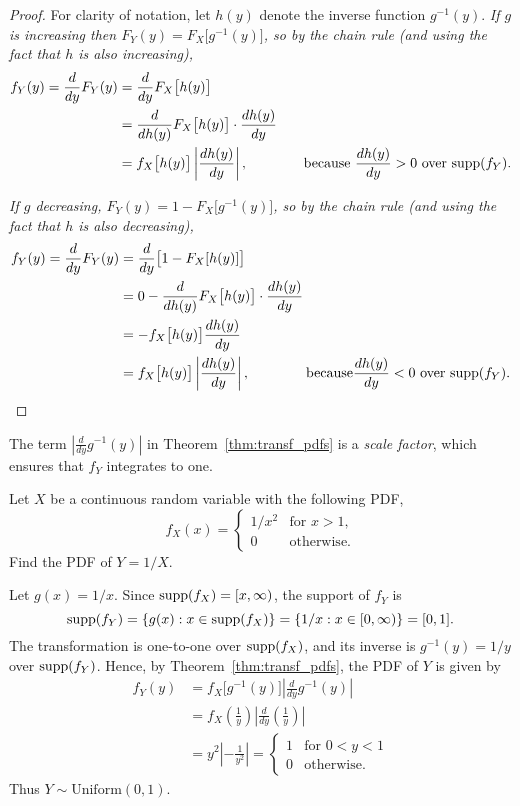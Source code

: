 \begin{proof}
For clarity of notation, let $h(y)$ denote the inverse function $g^{-1}(y)$.
\ben
\it If $g$ is increasing then $F_Y(y) = F_X\big[g^{-1}(y)\big]$, so by the chain rule (and using the fact that $h$ is also increasing),
\begin{align*}
f_Y(y)
	= \frac{d}{dy} F_Y(y)
	& = \frac{d}{dy} F_X\big[h(y)\big] \\
	& = \frac{d}{dh(y)} F_X\big[h(y)\big]\cdot \frac{dh(y)}{dy} \\
	& = f_X\big[h(y)\big]\left|\frac{dh(y)}{dy}\right|, \text{\qquad\qquad because } \frac{dh(y)}{dy}>0\text{ over $\text{supp}(f_Y)$.}
\end{align*}

\it If $g$ decreasing, $F_Y(y) = 1 - F_X\big[g^{-1}(y)\big]$, so by the chain rule  (and using the fact that $h$ is also decreasing),
\begin{align*}
f_Y(y)
	= \frac{d}{dy} F_Y(y)
	& = \frac{d}{dy} \big[1 - F_X[h(y)]\big] \\
	& = 0 - \frac{d}{dh(y)} F_X\big[h(y)\big]\cdot \frac{dh(y)}{dy} \\
	& = - f_X\big[h(y)\big] \frac{dh(y)}{dy} \\
	& = f_X\big[h(y)\big]\left|\frac{dh(y)}{dy}\right|, \text{\qquad\qquad because} \frac{dh(y)}{dy}<0\text{ over $\text{supp}(f_Y)$.}
\end{align*}
\een
\end{proof}

\begin{remark}
The term $\left|\frac{d}{dy}g^{-1}(y)\right|$ in Theorem~\ref{thm:transf_pdfs} is a \emph{scale factor}, which ensures that $f_Y$ integrates to one.
\end{remark}

\begin{example}
Let $X$ be a continuous random variable with the following PDF,
\[
f_X(x) = \begin{cases}
	1/x^2	& \text{for $x > 1$,} \\
	0		& \text{otherwise.}
\end{cases}
\]
Find the PDF of $Y=1/X$.
\end{example}

\begin{solution}
Let $g(x) = 1/x$. Since $\text{supp}(f_X)=[x,\infty)$, the support of $f_Y$ is 
\[
\text{supp}(f_Y) = \{g(x): x\in\text{supp}(f_X)\} = \{1/x :x\in[0,\infty)\} = [0,1].
\]
The transformation is one-to-one over $\text{supp}(f_X)$, and its inverse is $g^{-1}(y) = 1/y$ over $\text{supp}(f_Y)$. Hence, by Theorem~\ref{thm:transf_pdfs}, the PDF of $Y$ is given by
\begin{align*}
f_Y(y)
	& = f_X\big[g^{-1}(y)\big]\left|\frac{d}{dy}g^{-1}(y)\right| \\
	& = f_X\left(\frac{1}{y}\right)\left|\frac{d}{dy}\left(\frac{1}{y}\right)\right| \\
	& = y^2 \left|-\frac{1}{y^2}\right| 
	= \begin{cases}
		1	& \text{for } 0<y<1 \\
		0	& \text{otherwise.}
	\end{cases}
\end{align*}
Thus $Y\sim\text{Uniform}(0,1)$.
\end{solution}


